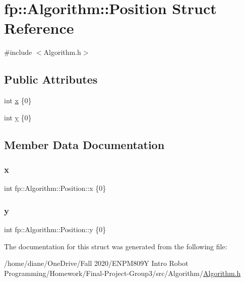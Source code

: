 \hypertarget{structfp_1_1_algorithm_1_1_position}{}\section{fp\+:\+:Algorithm\+:\+:Position Struct Reference}
\label{structfp_1_1_algorithm_1_1_position}


{\ttfamily \#include $<$Algorithm.\+h$>$}

\subsection*{Public Attributes}
\begin{DoxyCompactItemize}
\item 
int \hyperlink{structfp_1_1_algorithm_1_1_position_a3ff5edbcb349dc2f7fcc17b9b7d646f8}{x} \{0\}
\item 
int \hyperlink{structfp_1_1_algorithm_1_1_position_a78a81d6698d3fb3479a433d389fac322}{y} \{0\}
\end{DoxyCompactItemize}


\subsection{Member Data Documentation}
\mbox{\label{structfp_1_1_algorithm_1_1_position_a3ff5edbcb349dc2f7fcc17b9b7d646f8}} 
\subsubsection{\texorpdfstring{x}{x}}
{\footnotesize\ttfamily int fp\+::\+Algorithm\+::\+Position\+::x \{0\}}

\mbox{\label{structfp_1_1_algorithm_1_1_position_a78a81d6698d3fb3479a433d389fac322}} 
\subsubsection{\texorpdfstring{y}{y}}
{\footnotesize\ttfamily int fp\+::\+Algorithm\+::\+Position\+::y \{0\}}



The documentation for this struct was generated from the following file\+:\begin{DoxyCompactItemize}
\item 
/home/diane/\+One\+Drive/\+Fall 2020/\+E\+N\+P\+M809\+Y Intro Robot Programming/\+Homework/\+Final-\/\+Project-\/\+Group3/src/\+Algorithm/\hyperlink{_algorithm_8h}{Algorithm.\+h}\end{DoxyCompactItemize}
